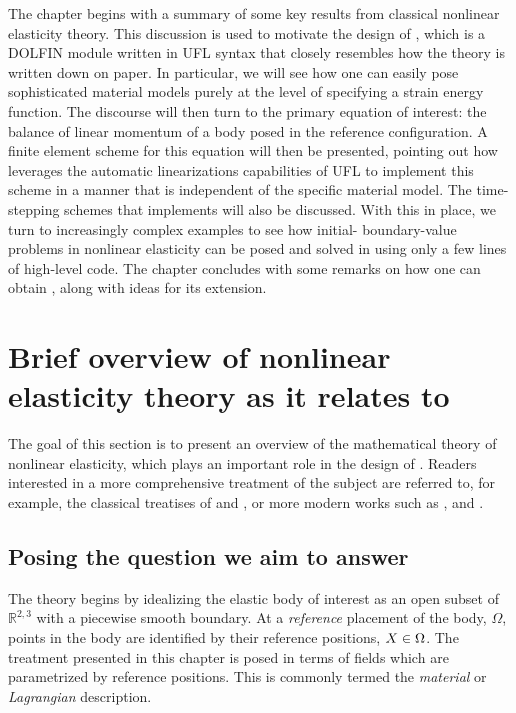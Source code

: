 The chapter begins with a summary of some key results from classical
nonlinear elasticity theory. This discussion is used to motivate the
design of \twist, which is a DOLFIN \citep{LoggWells2010} module
written in UFL syntax \citep{AlnaesA.Logg2009} that closely resembles
how the theory is written down on paper. In particular, we will see
how one can easily pose sophisticated material models purely at the
level of specifying a strain energy function. The discourse will then
turn to the primary equation of interest: the balance of linear
momentum of a body posed in the reference configuration. A finite
element scheme for this equation will then be presented, pointing out
how \twist{} leverages the automatic linearizations capabilities of UFL
to implement this scheme in a manner that is independent of the
specific material model. The time-stepping schemes that \twist{}
implements will also be discussed. With this in place, we turn to
increasingly complex examples to see how initial- boundary-value
problems in nonlinear elasticity can be posed and solved in \twist{}
using only a few lines of high-level code. The chapter concludes with
some remarks on how one can obtain \twist, along with ideas for its
extension.

\section{Brief overview of nonlinear elasticity theory as it relates
  to \twist}

The goal of this section is to present an overview of the mathematical
theory of nonlinear elasticity, which plays an important role in the
design of \twist. Readers interested in a more comprehensive treatment
of the subject are referred to, for example, the classical treatises
of \citet{TruesdellToupin1960} and \citet{TruesdellNoll1965}, or more
modern works such as \citet{Gurtin1981}, \citet{Ogden1997} and
\citet{Holzapfel2000}.

\subsection{Posing the question we aim to answer}

The theory begins by idealizing the elastic body of interest as an
open subset of $\mathbb{R}^{2, 3}$ with a piecewise smooth
boundary. At a {\em reference} placement of the body, $\Omega$, points
in the body are identified by their reference positions, $\mbox{$ X$} \in
\Omega$. The treatment presented in this chapter is posed in terms of
fields which are parametrized by reference positions. This is commonly
termed the {\em material} or {\em Lagrangian} description.


